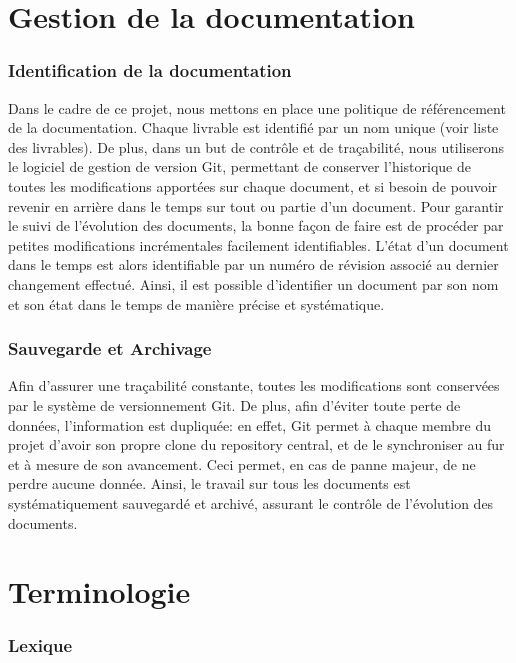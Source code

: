 \part{Gestion de la documentation}

\section{Identification de la documentation}

Dans le cadre de ce projet, nous mettons en place une politique de référencement de la documentation. Chaque livrable est identifié par un nom unique (voir liste des livrables). De plus, dans un but de contrôle et de traçabilité, nous utiliserons le logiciel de gestion de version Git, permettant de conserver l'historique de toutes les modifications apportées sur chaque document, et si besoin de pouvoir revenir en arrière dans le temps sur tout ou partie d'un document. Pour garantir le suivi de l'évolution des documents, la bonne façon de faire est de procéder par petites modifications incrémentales facilement identifiables. L'état d'un document dans le temps est alors identifiable par un numéro de révision associé au dernier changement effectué. Ainsi, il est possible d'identifier un document par son nom et son état dans le temps de manière précise et systématique.

\section{Sauvegarde et Archivage}

Afin d'assurer une traçabilité constante, toutes les modifications sont conservées par le système de versionnement Git. De plus, afin d'éviter toute perte de données, l'information est dupliquée: en effet, Git permet à chaque membre du projet d'avoir son propre clone du repository central, et de le synchroniser au fur et à mesure de son avancement. Ceci permet, en cas de panne majeur, de ne perdre aucune donnée. Ainsi, le travail sur tous les documents est systématiquement sauvegardé et archivé, assurant le contrôle de l'évolution des documents.

\part{Terminologie}

\section{Lexique}

